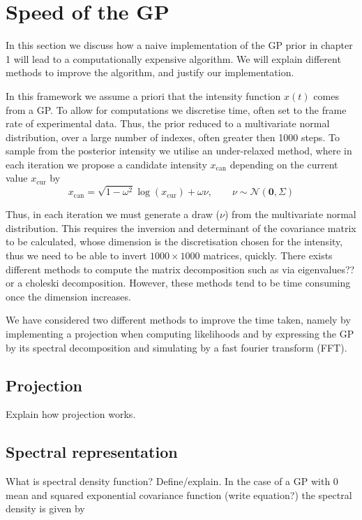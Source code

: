 \documentclass[../main.tex]{subfiles}
\begin{document}
\section{Speed of the GP}
In this section we discuss how a naive implementation of the GP prior in chapter 1 will lead to a computationally expensive algorithm. We will explain different methods to improve the algorithm, and justify our implementation.
 
In this framework we assume a priori that the intensity function $x(t)$ comes from a GP. To allow for computations we discretise time, often set to the frame rate of experimental data. Thus, the prior reduced to a multivariate normal distribution, over a large number of indexes, often greater then 1000 steps. To sample from the posterior intensity we utilise an under-relaxed method, where in each iteration we propose a candidate intensity $x_{\mathrm{can}}$ depending on the current value $x_{\mathrm{cur}}$ by
$$
x_{\mathrm{can}} = \sqrt{1-\omega^2} \log \left(x_{\mathrm{cur}} \right) +  \omega \nu , \qquad \nu \sim \mathcal{N}\left( \mathbf{0}, \Sigma \right)
$$ 

Thus, in each iteration we must generate a draw ($\nu$) from the multivariate normal distribution. This requires the inversion and determinant of the covariance matrix to be calculated, whose dimension is the discretisation chosen for the intensity, thus we need to be able to invert $1000 \times 1000$ matrices, quickly. There exists different methods to compute the matrix decomposition such as via eigenvalues?? or a choleski decomposition. However, these methods tend to be time consuming once the dimension increases. 

We have considered two different methods to improve the time taken, namely by implementing a projection when computing likelihoods and by expressing the GP by its spectral decomposition and simulating by a fast fourier transform (FFT). 

\subsection{Projection}
Explain how projection works.

\subsection{Spectral representation}
What is spectral density function? Define/explain.
In the case of a GP with 0 mean and squared exponential covariance function (write equation?) the spectral density is given by
\end{document}

